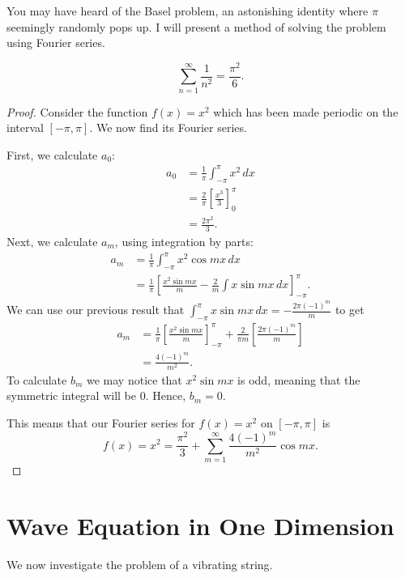 \documentclass{amsart}
\begin{document}
  You may have heard of the Basel problem, an astonishing identity where $\pi$ seemingly randomly pops up. I will present a method of solving the problem using Fourier series.
  \begin{theorem}
    \[
      \sum_{n = 1}^{\infty} \frac{1}{n^2} = \frac{\pi^2}{6}
    .\] 
  \end{theorem}
  \begin{proof}
    Consider the function $f(x) = x^2$ which has been made periodic on the interval $[-\pi, \pi]$. We now find its Fourier series.

    First, we calculate $a_0$:
    \begin{align*}
      a_0 &= \frac{1}{\pi} \int_{-\pi}^{\pi} x^2 \, dx \\
          &= \frac{2}{\pi}\left[ \frac{x^3}{3} \right]_{0}^{\pi} \\
          &= \frac{2\pi^2}{3}.
    \end{align*}
    Next, we calculate $a_m$, using integration by parts:
    \begin{align*}
      a_m &= \frac{1}{\pi} \int_{-\pi}^{\pi} x^2 \cos mx \, dx \\
          &= \frac{1}{\pi} \left[ \frac{x^2 \sin mx}{m} - \frac{2}{m} \int x \sin mx \, dx \right]_{-\pi}^{\pi} .
    \end{align*}
    We can use our previous result that $\int_{-\pi}^{\pi} x \sin mx \, dx = -\frac{2\pi(-1)^{m}}{m}$ to get
    \begin{align*}
      a_m &= \frac{1}{\pi} \left[ \frac{x^2 \sin mx}{m} \right]_{-\pi}^{\pi} + \frac{2}{\pi m}\left[ \frac{2\pi(-1)^{m}}{m} \right] \\
          &= \frac{4(-1)^{m}}{m^{2}}.
    \end{align*}
    To calculate $b_m$ we may notice that $x^2 \sin mx$ is odd, meaning that the symmetric integral will be 0. Hence, $b_m = 0$.

    This means that our Fourier series for $f(x) = x^2$ on $[-\pi, \pi]$ is \[
      f(x) = x^2 = \frac{\pi^2}{3} + \sum_{m=1}^{\infty} \frac{4(-1)^{m}}{m^2} \cos mx
    .\] 
  \end{proof}

  \newpage
  \section{Wave Equation in One Dimension}
  
  We now investigate the problem of a vibrating string.
\end{document}
